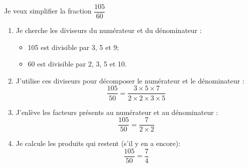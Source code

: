 \begin{mymeth}
	Je veux simplifier la fraction $\dfrac{105}{60}$
	
	\begin{enumerate}
		\item Je cherche les diviseurs du numérateur et du dénominateur :
			\begin{itemize}
				\item 105 est divisible par 3, 5 et 9;
				\item 60 est divisible par 2, 3, 5 et 10.
			\end{itemize}
		\item J'utilise ces diviseurs pour décomposer le numérateur et le dénominateur :
			\begin{equation*}
				\frac{105}{50} = \frac{3 \times 5 \times 7}{2 \times 2 \times 3 \times 5 }
			\end{equation*}
		\item J'enlève les facteurs présents au numérateur et au dénominateur :
			\begin{equation*}
				\frac{105}{50} = \frac{7}{2 \times 2}		
			\end{equation*}
			
		\item Je calcule les produits qui restent (s'il y en a encore):
			\begin{equation*}
				\frac{105}{50} = \frac{7}{4}		
			\end{equation*}
		
	\end{enumerate}

	
\end{mymeth}
	